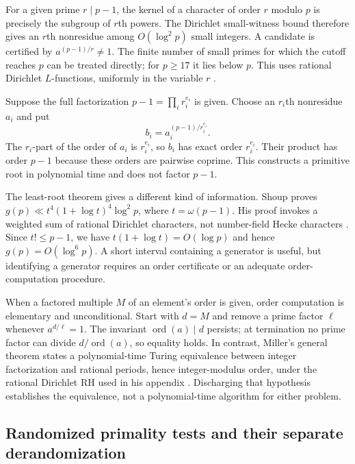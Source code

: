 \documentclass[11pt]{article}
\newcommand{\ord}{\operatorname{ord}}
\theoremstyle{definition}
\theoremstyle{remark}
\begin{document}
For a given prime $r\mid p-1$, the kernel of a character of order $r$
modulo $p$ is precisely the subgroup of $r$th powers. The Dirichlet
small-witness bound therefore gives an $r$th nonresidue among
$O(\log^2p)$ small integers. A candidate is certified by
$a^{(p-1)/r}\ne1$. The finite number of small primes for which the cutoff
reaches $p$ can be treated directly; for $p\ge17$ it lies below $p$.
This uses rational Dirichlet $L$-functions, uniformly in the variable $r$
\citep[pp.~1--2]{LLS2015}.

Suppose the full factorization $p-1=\prod_i r_i^{e_i}$ is given.
Choose an $r_i$th nonresidue $a_i$ and put
\[
 b_i=a_i^{(p-1)/r_i^{e_i}}.
\]
The $r_i$-part of the order of $a_i$ is $r_i^{e_i}$, so $b_i$ has exact
order $r_i^{e_i}$. Their product has order $p-1$ because these orders are
pairwise coprime. This constructs a primitive root in polynomial time and
does not factor $p-1$.

The least-root theorem gives a different kind of information. Shoup proves
$g(p)\ll t^4(1+\log t)^4\log^2p$, where $t=\omega(p-1)$.
His proof invokes a weighted sum of rational Dirichlet characters, not
number-field Hecke characters \citep[Theorem~3, author p.~4;
Proposition~9, p.~10; Section~6, p.~13]{Shoup1992}.
Since $t!\le p-1$, we have $t(1+\log t)=O(\log p)$ and hence
$g(p)=O(\log^6p)$. A short interval containing a generator is useful,
but identifying a generator requires an order certificate or an adequate
order-computation procedure.

When a factored multiple $M$ of an element's order is given, order
computation is elementary and unconditional. Start with $d=M$ and remove
a prime factor $\ell$ whenever $a^{d/\ell}=1$. The invariant
$\ord(a)\mid d$ persists; at termination no prime factor can divide
$d/\ord(a)$, so equality holds. In contrast, Miller's general theorem
states a polynomial-time Turing equivalence between integer factorization
and rational periods, hence integer-modulus order, under the rational
Dirichlet RH used in his appendix
\citep[Theorem~4, pp.~311--312; pp.~315--316]{Miller1976}.
Discharging that hypothesis establishes the equivalence, not a
polynomial-time algorithm for either problem.

\subsection{Randomized primality tests and their separate derandomization}
\end{document}
